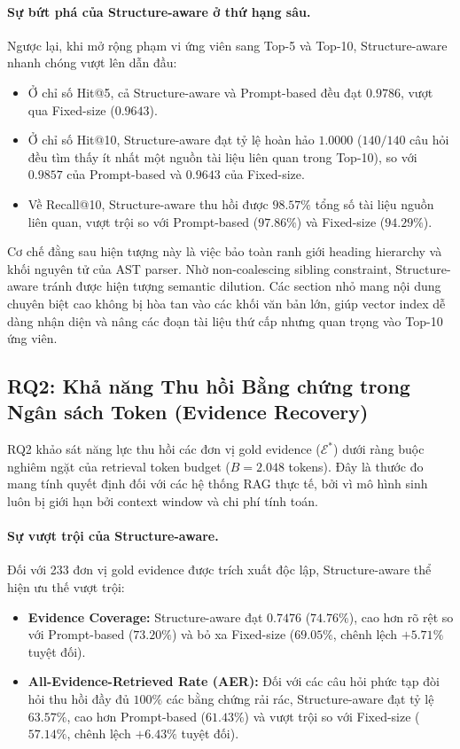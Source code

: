 \paragraph{Sự bứt phá của Structure-aware ở thứ hạng sâu.}
Ngược lại, khi mở rộng phạm vi ứng viên sang Top-5 và Top-10, Structure-aware nhanh chóng vượt lên dẫn đầu:
\begin{itemize}
    \item Ở chỉ số Hit@5, cả Structure-aware và Prompt-based đều đạt $0.9786$, vượt qua Fixed-size ($0.9643$).
    \item Ở chỉ số Hit@10, Structure-aware đạt tỷ lệ hoàn hảo $1.0000$ ($140/140$ câu hỏi đều tìm thấy ít nhất một nguồn tài liệu liên quan trong Top-10), so với $0.9857$ của Prompt-based và $0.9643$ của Fixed-size.
    \item Về Recall@10, Structure-aware thu hồi được $98.57\%$ tổng số tài liệu nguồn liên quan, vượt trội so với Prompt-based ($97.86\%$) và Fixed-size ($94.29\%$).
\end{itemize}
Cơ chế đằng sau hiện tượng này là việc bảo toàn ranh giới heading hierarchy và khối nguyên tử của AST parser. Nhờ non-coalescing sibling constraint, Structure-aware tránh được hiện tượng semantic dilution. Các section nhỏ mang nội dung chuyên biệt cao không bị hòa tan vào các khối văn bản lớn, giúp vector index dễ dàng nhận diện và nâng các đoạn tài liệu thứ cấp nhưng quan trọng vào Top-10 ứng viên.

\subsection{RQ2: Khả năng Thu hồi Bằng chứng trong Ngân sách Token (Evidence Recovery)}
\label{subsec:rq2_evidence}

RQ2 khảo sát năng lực thu hồi các đơn vị gold evidence ($\mathcal{E}^*$) dưới ràng buộc nghiêm ngặt của retrieval token budget ($B = 2.048$ tokens). Đây là thước đo mang tính quyết định đối với các hệ thống RAG thực tế, bởi vì mô hình sinh luôn bị giới hạn bởi context window và chi phí tính toán.

\paragraph{Sự vượt trội của Structure-aware.}
Đối với 233 đơn vị gold evidence được trích xuất độc lập, Structure-aware thể hiện ưu thế vượt trội:
\begin{itemize}
    \item \textbf{Evidence Coverage:} Structure-aware đạt $0.7476$ ($74.76\%$), cao hơn rõ rệt so với Prompt-based ($73.20\%$) và bỏ xa Fixed-size ($69.05\%$, chênh lệch $+5.71\%$ tuyệt đối).
    \item \textbf{All-Evidence-Retrieved Rate (AER):} Đối với các câu hỏi phức tạp đòi hỏi thu hồi đầy đủ $100\%$ các bằng chứng rải rác, Structure-aware đạt tỷ lệ $63.57\%$, cao hơn Prompt-based ($61.43\%$) và vượt trội so với Fixed-size ($57.14\%$, chênh lệch $+6.43\%$ tuyệt đối).
\end{itemize}

